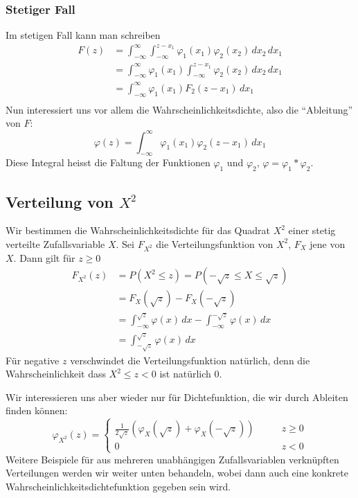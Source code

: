 \subsubsection{Stetiger Fall}
Im stetigen Fall kann man schreiben
\begin{align*}
F(z)&=\int_{-\infty}^{\infty}\int_{-\infty}^{z-x_1}\varphi_1(x_1)\varphi_2(x_2)
\,dx_2\,dx_1\\
&=\int_{-\infty}^{\infty}
\varphi_1(x_1)
\int_{-\infty}^{z-x_1}
\varphi_2(x_2)
\,dx_2\,dx_1\\
&=\int_{-\infty}^{\infty}
\varphi_1(x_1)
F_2(z-x_1)
\,dx_1\\
\end{align*}
Nun interessiert uns vor allem die Wahrscheinlichkeitsdichte, also die
``Ableitung'' von $F$:
\[
\varphi(z)=\int_{-\infty}^{\infty}\varphi_1(x_1)\varphi_2(z-x_1)\,dx_1
\]
Diese Integral heisst die Faltung der Funktionen $\varphi_1$ und $\varphi_2$,
$\varphi=\varphi_1*\varphi_2$.

\subsection{Verteilung von \texorpdfstring{$X^2$}{X hoch 2}}
Wir bestimmen die Wahrscheinlichkeitsdichte für das Quadrat 
$X^2$ einer stetig verteilte Zufallsvariable $X$.
Sei $F_{X^2}$ die Verteilungsfunktion von $X^2$, $F_X$ jene von $X$.
Dann gilt für $z\ge 0$
\begin{align*}
F_{X^2}(z)&=P(X^2\le z)=P(-\sqrt{z}\le X\le \sqrt{z})\\
&=F_X(\sqrt{z})-F_X(-\sqrt{z})\\
&=\int_{-\infty}^{\sqrt{z}}\varphi(x)\,dx-\int_{-\infty}^{-\sqrt{z}}\varphi(x)\,dx\\
&=\int_{-\sqrt{z}}^{\sqrt{z}}\varphi(x)\,dx
\end{align*}
Für negative $z$ verschwindet die Verteilungsfunktion natürlich, denn
die Wahrscheinlichkeit dass $X^2\le z <0$ ist natürlich 0.

Wir interessieren uns aber wieder nur für Dichtefunktion, die wir
durch Ableiten finden können:
\[
\varphi_{X^2}(z)=\begin{cases}
\frac{1}{2\sqrt{z}}\left(\varphi_X(\sqrt{z})+\varphi_X(-\sqrt{z})\right)&\qquad z\ge 0\\
0&\qquad z<0
\end{cases}
\]
Weitere Beispiele für aus mehreren unabhängigen Zufallsvariablen
verknüpften Verteilungen werden wir weiter unten behandeln, wobei
dann auch eine konkrete Wahrscheinlichkeitsdichtefunktion gegeben sein
wird.

